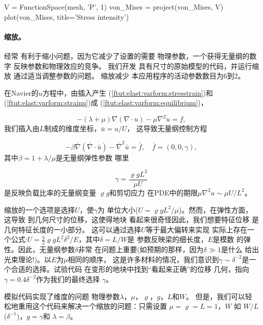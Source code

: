 \begin{python}
V = FunctionSpace(mesh, 'P', 1)
von_Mises = project(von_Mises, V)
plot(von_Mises, title='Stress intensity')
\end{python}

\paragraph{缩放。}

经常
有利于缩小问题，因为它减少了设置的需要
物理参数，一个获得无量纲的数字
反映参数和物理效应的竞争。 我们开发
具有尺寸的原始模型的代码，并运行缩放
通过适当调整参数的问题。 缩放减少
本应用程序的活动参数数目为6到2。

在Navier的$u$方程中，由插入产生
(\ref{ftut:elast:varform:stresstrain})和
(\ref{ftut:elast:varform:strainu})成
(\ref{ftut:elast:varform:equilibrium})，

\[ -(\lambda + \mu)\nabla(\nabla\cdot u) - \mu\nabla^2 u = f,\]
我们插入由$L$制成的维度坐标，$\bar u=u/U$，
这导致无量纲控制方程

\[
-\beta\bar\nabla(\bar\nabla\cdot \bar u) - \bar\nabla^2 \bar u =
\bar f,\quad \bar f = (0,0,\gamma),\]
其中$\beta = 1 + \lambda/\mu$是无量纲弹性参数
哪里

\[ \gamma = \frac{\varrho gL^2}{\mu U}\]
是反映负载比率的无量纲变量
$\varrho g$和剪切应力
在PDE中的期限$\mu\nabla^2u\sim \mu U/L^2$。

缩放的一个选项是选择$U$，使$\gamma$为
单位大小($U = \varrho gL^2/\mu$)。然而，在弹性方面，这导致
到几何尺寸的位移，这使得地块
看起来很奇怪因此，我们想要特征位移
是几何特征长度的一小部分。
这可以通过选择$U$等于最大偏转来实现
实际上存在一个公式:$U =
\frac{3}{2}\varrho gL^2\delta^2/E$，其中$\delta = L/W$是
参数反映梁的细长度，$E$是模数
的弹性。因此，无量纲参数$\delta$非常
在问题上重要(如预期的那样，因为$\delta\gg 1$是什么
  给出光束理论!)。以$E$为$\mu$相同的顺序，
这是许多材料的情况，我们意识到$\gamma \sim
\delta^{-2}$是一个合适的选择。试验代码
在变形的地块中找到“看起来正确”的位移
几何，指向$\gamma = 0.4\delta^{-2}$作为我们的最终选择
$\gamma$。

模拟代码实现了维度的问题
物理参数$\lambda$，$\mu$，$\varrho$，$g$，$L$和$W$。
但是，我们可以轻松地重用这个代码来解决一个缩放的问题：只需设置
$\mu = \varrho = L = 1$，$W$ 如 $W/L$ ($\delta^{-1}$)，$g=\gamma$和
$\lambda=\beta$。


